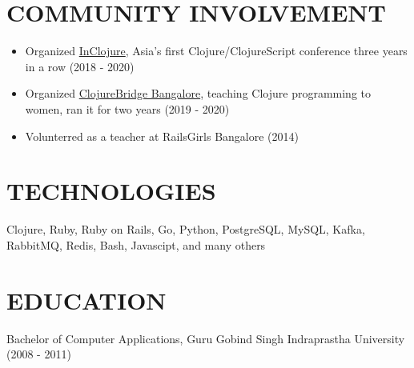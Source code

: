 \documentclass[11pt,a4paper]{article}
\begin{document}
\section*{COMMUNITY INVOLVEMENT}
\begin{itemize}
    \item Organized \href{https://inclojure.org}{InClojure}, Asia's first Clojure/ClojureScript conference three years in a row (2018 - 2020)
    \item Organized \href{https://tramline.app/clojurebridge}{ClojureBridge Bangalore}, teaching Clojure programming to women, ran it for two years (2019 - 2020)
    \item Volunterred as a teacher at RailsGirls Bangalore (2014)
\end{itemize}

\section*{TECHNOLOGIES}
Clojure, Ruby, Ruby on Rails, Go, Python, PostgreSQL, MySQL, Kafka, RabbitMQ, Redis, Bash, Javascipt, and many others

\section*{EDUCATION}
Bachelor of Computer Applications, Guru Gobind Singh Indraprastha University (2008 - 2011)
\end{document}
